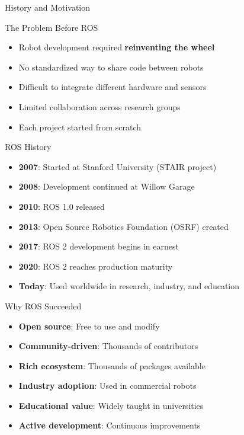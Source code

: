 \begin{frame}[allowframebreaks]{History and Motivation}
    \begin{block}{The Problem Before ROS}
        \begin{itemize}
            \item Robot development required \textbf{reinventing the wheel}
            \item No standardized way to share code between robots
            \item Difficult to integrate different hardware and sensors
            \item Limited collaboration across research groups
            \item Each project started from scratch
        \end{itemize}
    \end{block}

    \framebreak

    \begin{block}{ROS History}
        \begin{itemize}
            \item \textbf{2007}: Started at Stanford University (STAIR project)
            \item \textbf{2008}: Development continued at Willow Garage
            \item \textbf{2010}: ROS 1.0 released
            \item \textbf{2013}: Open Source Robotics Foundation (OSRF) created
            \item \textbf{2017}: ROS 2 development begins in earnest
            \item \textbf{2020}: ROS 2 reaches production maturity
            \item \textbf{Today}: Used worldwide in research, industry, and education
        \end{itemize}
    \end{block}

    \framebreak

    \begin{block}{Why ROS Succeeded}
        \begin{itemize}
            \item \textbf{Open source}: Free to use and modify
            \item \textbf{Community-driven}: Thousands of contributors
            \item \textbf{Rich ecosystem}: Thousands of packages available
            \item \textbf{Industry adoption}: Used in commercial robots
            \item \textbf{Educational value}: Widely taught in universities
            \item \textbf{Active development}: Continuous improvements
        \end{itemize}
    \end{block}


\end{frame}
